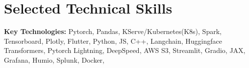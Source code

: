 \documentclass[a4paper,10pt]{article}
\begin{document}
\section{Selected Technical Skills}
\textbf{Key Technologies:} Pytorch, Pandas, KServe/Kubernetes(K8s), Spark, Tensorboard, Plotly, Flutter, Python, JS, C++, Langchain, Huggingface Transformers, Pytorch Lightning, DeepSpeed, AWS S3, Streamlit, Gradio, JAX, Grafana, Humio, Splunk, Docker,\\
\end{document}
